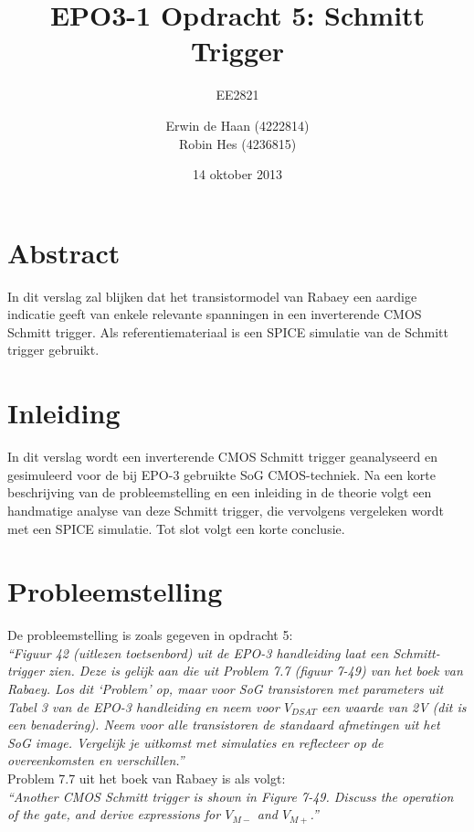 \documentclass{scrartcl}  %
\author{Erwin {de Haan} (4222814)  \\{Robin Hes} (4236815)}
\title{EPO3-1 Opdracht 5: Schmitt Trigger}
\subtitle{EE2821}
\date{14 oktober 2013}
\begin{document}
\maketitle
\vspace{80 mm}

\section*{Abstract}
\label{sec:trig-abstr}
In dit verslag zal blijken dat het transistormodel van Rabaey een aardige indicatie geeft van enkele relevante spanningen in een inverterende CMOS Schmitt trigger. Als referentiemateriaal is een SPICE simulatie van de Schmitt trigger gebruikt.

\newpage
\setlength{\cftbeforetoctitleskip}{-3em}
\tableofcontents

\section{Inleiding}
\label{sec:trig-inl}
In dit verslag wordt een inverterende CMOS Schmitt trigger geanalyseerd en gesimuleerd voor de bij EPO-3 gebruikte SoG CMOS-techniek. Na een korte beschrijving van de probleemstelling en een inleiding in de theorie volgt een handmatige analyse van deze Schmitt trigger, die vervolgens vergeleken wordt met een SPICE simulatie. Tot slot volgt een korte conclusie.

\newpage
{}

\section{Probleemstelling}
\label{sec:trig-prob}
De probleemstelling is zoals gegeven in opdracht 5: \\
\textit{
``Figuur 42 (uitlezen toetsenbord) uit de EPO-3 handleiding laat een Schmitt-trigger zien. Deze is gelijk
aan die uit Problem 7.7 (figuur 7-49) van het boek van Rabaey. Los dit ‘Problem’ op, maar voor SoG
transistoren met parameters uit Tabel 3 van de EPO-3 handleiding en neem voor $V_{DSAT}$ een waarde van
2V (dit is een benadering). Neem voor alle transistoren de standaard afmetingen uit het SoG image.
Vergelijk je uitkomst met simulaties en reflecteer op de overeenkomsten en verschillen.''
}
\cite[2]{epo3-opdracht-5}
\\

Problem 7.7 uit het boek van Rabaey is als volgt: \\
\textit{
``Another CMOS Schmitt trigger is shown in Figure 7-49. Discuss the operation of the gate, and derive expressions for $V_{M-}$ and $V_{M+}$.''
}
\cite[367]{rabaey-integrated-circuits}
\\
\end{document}
